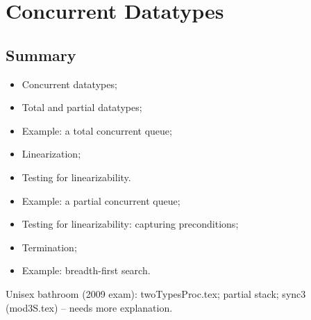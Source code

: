 \chapter{Concurrent Datatypes}
\label{chap:datatypes}




\section{Summary}

\begin{itemize}
\item 
Concurrent datatypes;

\item
Total and partial datatypes;

\item Example: a total concurrent queue;

\item
Linearization; 

\item Testing for linearizability.

\item 
Example: a partial concurrent queue;

\item
Testing for linearizability: capturing preconditions;

\item 
Termination;

\item Example: breadth-first search.

\end{itemize}


\exercises





Unisex bathroom (2009 exam): twoTypesProc.tex; 
partial stack;
sync3 (mod3S.tex) -- needs more explanation.

